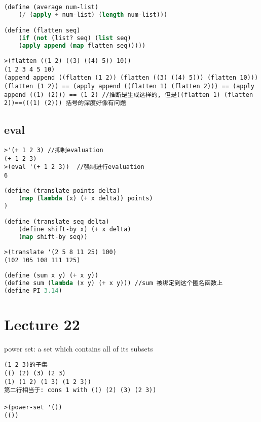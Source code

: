 \documentclass{article}
\begin{document}
\begin{lstlisting}[language = Lisp]
(define (average num-list)
	(/ (apply + num-list) (length num-list)))

(define (flatten seq)
	(if (not (list? seq) (list seq)
	(apply append (map flatten seq)))))
\end{lstlisting}

\begin{verbatim}
>(flatten ((1 2) ((3) ((4) 5)) 10))
(1 2 3 4 5 10)
(append append ((flatten (1 2)) (flatten ((3) ((4) 5))) (flatten 10)))
(flatten (1 2)) == (apply append ((flatten 1) (flatten 2))) == (apply append ((1) (2))) == (1 2) //推断是生成这样的, 但是((flatten 1) (flatten 2))==(((1) (2))) 括号的深度好像有问题
\end{verbatim}

\subsection{eval}
\begin{verbatim}
>'(+ 1 2 3) //抑制evaluation
(+ 1 2 3)
>(eval '(+ 1 2 3))  //强制进行evaluation
6
\end{verbatim}

\begin{lstlisting}[language = Lisp]
(define (translate points delta)
	(map (lambda (x) (+ x delta)) points)
)

(define (translate seq delta)
	(define shift-by x) (+ x delta)
	(map shift-by seq))
\end{lstlisting}

\begin{verbatim}
>(translate '(2 5 8 11 25) 100)
(102 105 108 111 125)
\end{verbatim}

\begin{lstlisting}[language = Lisp]
(define (sum x y) (+ x y))
(define sum (lambda (x y) (+ x y))) //sum 被绑定到这个匿名函数上
(define PI 3.14)
\end{lstlisting}

\section{Lecture 22}
power set: a set which contains all of its subsets
\begin{verbatim}
(1 2 3)的子集
(() (2) (3) (2 3)
(1) (1 2) (1 3) (1 2 3))
第二行相当于: cons 1 with (() (2) (3) (2 3))

>(power-set '())
(())
\end{verbatim}
\end{document}
